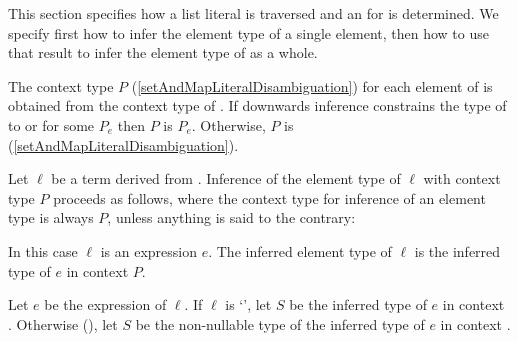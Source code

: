 \documentclass[makeidx]{article}
\begin{document}
{\LMHash{}%
This section specifies how a list literal  is traversed and an
for  is determined.
We specify first how to infer the element type of a single element,
then how to use that result to infer
the element type of  as a whole.

\LMHash{}%
The context type $P$
(\ref{setAndMapLiteralDisambiguation})
for each element of  is
obtained from the context type of .
If downwards inference constrains the type of 
to  or  for some $P_e$
then $P$ is $P_e$.
Otherwise, $P$ is \FreeContext{}
(\ref{setAndMapLiteralDisambiguation}).

\LMHash{}%
Let $\ell$ be a term derived from .
Inference of the element type of $\ell$ with context type $P$
proceeds as follows,
where the context type for inference of an element type is always $P$,
unless anything is said to the contrary:

\LMHash{}%
In this case $\ell$ is an expression $e$.
The inferred element type of $\ell$ is
the inferred type of $e$ in context $P$.
\EndCase

\LMHash{}%
\EndCase

\LMHash{}%
Let $e$ be the expression of $\ell$.
If $\ell$ is `',
let $S$ be the inferred type of $e$ in context .
Otherwise
(),
let $S$ be the non-nullable type of
the inferred type of $e$ in context .

}
\end{document}
